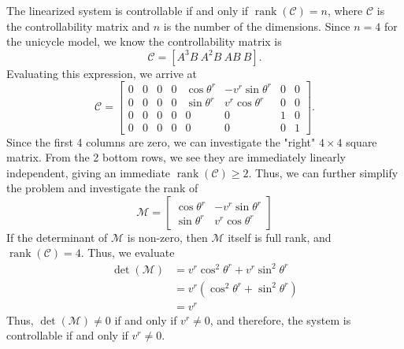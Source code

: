The linearized system is controllable if and only if
$\operatorname{rank}(\mathcal{C}) = n$, where $\mathcal{C}$ is the
controllability matrix and $n$ is the number of the dimensions. Since $n=4$ for
the unicycle model, we know the controllability matrix is
\begin{equation*}
    \mathcal{C} = \left[ A^3B ~ A^2B ~ AB ~ B \right].
\end{equation*} 
Evaluating this expression, we arrive at
\begin{equation*}
    \mathcal{C} = 
    \left[\begin{array}{cc|cc|cc|cc}
        0 & 0 & 0 & 0 & \cos\theta^r & -v^r\sin\theta^r & 0 & 0 \\
        0 & 0 & 0 & 0 & \sin\theta^r & v^r\cos\theta^r  & 0 & 0 \\
        0 & 0 & 0 & 0 & 0 & 0 & 1 & 0 \\
        0 & 0 & 0 & 0 & 0 & 0 & 0 & 1
    \end{array}\right].
\end{equation*}
Since the first 4 columns are zero, we can investigate the "right" $4 \times 4$
square matrix. From the 2 bottom rows, we see they are immediately linearly
independent, giving an immediate $\operatorname{rank}(\mathcal{C}) \geq 2$.
Thus, we can further simplify the problem and investigate the rank of 
\begin{equation*}
    \mathcal{M} = 
    \left[\begin{array}{cc}
        \cos\theta^r & -v^r\sin\theta^r \\
        \sin\theta^r & v^r\cos\theta^r 
    \end{array}\right]
\end{equation*}
If the determinant of $\mathcal{M}$ is non-zero, then $\mathcal{M}$ itself is
full rank, and $\operatorname{rank}(\mathcal{C}) = 4$. Thus, we evaluate 
\begin{align*}
    \det({\mathcal{M}}) &= v^r\cos^2\theta^r + v^r\sin^2\theta^r \\
    &= v^r(\cos^2\theta^r + \sin^2\theta^r) \\
    &= v^r
\end{align*}
Thus, $\det({\mathcal{M}}) \neq 0$ if and only if $v^r \neq 0$, and therefore,
the system is controllable if and only if $v^r \neq 0$. 